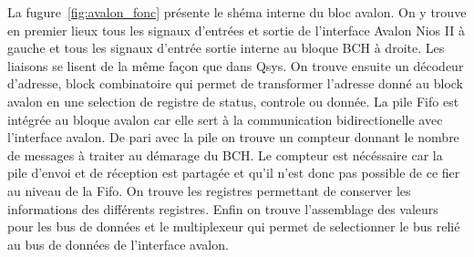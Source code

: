 \documentclass[a4paper, 11pt, svgnames]{report}
\begin{document}
            La fugure~\ref{fig:avalon_fonc} présente le shéma interne du bloc
            avalon. On y trouve en premier lieux tous les signaux d'entrées et
            sortie de l'interface Avalon Nios II à gauche et tous les signaux
            d'entrée sortie interne au bloque BCH à droite. Les liaisons se
            lisent de la même façon que dans Qsys. On trouve ensuite un
            décodeur d'adresse, block combinatoire qui permet de transformer
            l'adresse donné au block avalon en une selection de registre de
            status, controle ou donnée. La pile Fifo est intégrée au bloque
            avalon car elle sert à la communication bidirectionelle avec
            l'interface avalon. De pari avec la pile on trouve un compteur
            donnant le nombre de messages à traiter au démarage du BCH. Le
            compteur est nécéssaire car la pile d'envoi et de réception est
            partagée et qu'il n'est donc pas possible de ce fier au niveau de
            la Fifo. On trouve les registres permettant de conserver les
            informations des différents registres. Enfin on trouve l'assemblage
            des valeurs pour les bus de données et le multiplexeur qui permet de
            selectionner le bus relié au bus de données de l'interface avalon.
\end{document}
